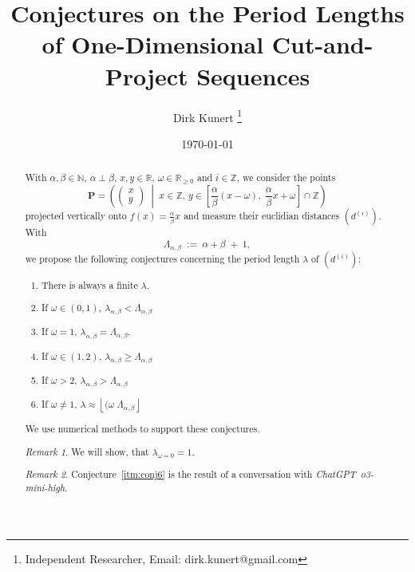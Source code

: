 \documentclass[11pt]{article}
\title{Conjectures on the Period Lengths of One-Dimensional Cut-and-Project Sequences}
\author{Dirk Kunert \thanks{Independent Researcher, Email: dirk.kunert@gmail.com}}
\date{\today}
\theoremstyle{remark}
\newtheorem{remark}{Remark}
\begin{document}
%
\newcommand{\showfigures}{true}
\newcommand{\todo}[1]{\textcolor{red}{TODO: {#1}}}
\newcommand{\langc}[0]{\mbox{C}\xspace}
\newcommand{\langp}[0]{\mbox{Python}\xspace}
\newcommand{\chat}[0]{\mbox{\emph{ChatGPT o3-mini-high}}\xspace}
\newcommand{\function}[1]{\mbox{\texttt{#1}}\xspace}

\maketitle
%
\begin{abstract}
With $\alpha, \beta \in \mathbb{N}$, $\alpha \perp \beta$, $x, y \in \mathbb{R}$, $\omega \in \mathbb{R}_{\ge 0}$ and $i \in \mathbb{Z}$, we consider the points
%
\begin{equation}
\mathbf{P} 
= \left(
\begin{pmatrix} x \\ y \end{pmatrix}
\;\middle|\;
x \in \mathbb{Z},\,
y \in 
\left[\frac{\alpha}{\beta} (x - \omega),\; \frac{\alpha}{\beta} x + \omega\right] 
\cap \mathbb{Z}
\right)\label{eq:points}
\end{equation}
%
projected vertically onto $f(x) = \frac{\alpha}{\beta} x$ and measure their euclidian distances $\left( d^{(i)} \right)$.
%
With
\[
\Lambda_{\alpha, \beta} \;:=\; \alpha + \beta \;+\; 1,
\]
%
we propose the following conjectures concerning the period length $\lambda$ of $\left( d^{(i)} \right)$:
%
\begin{enumerate}
	\item \label{itm:conj1} There is always a finite $\lambda$.
 	\item \label{itm:conj2} If \(\omega \in (0,1)\), $\lambda_{\alpha, \beta} < \Lambda_{\alpha, \beta}$
 	\item \label{itm:conj3} If \(\omega = 1\), $\lambda_{\alpha, \beta} = \Lambda_{\alpha, \beta}$.
 	\item \label{itm:conj4} If \(\omega \in (1,2)\), $\lambda_{\alpha, \beta} \ge \Lambda_{\alpha, \beta}$
 	\item \label{itm:conj5} If \(\omega > 2\), $\lambda_{\alpha, \beta} > \Lambda_{\alpha, \beta}$
 	\item \label{itm:conj6} If \(\omega \ne 1\), $\lambda \approx \left\lfloor (\omega \; \Lambda_{\alpha, \beta} \right\rfloor$
\end{enumerate}
%
We use numerical methods to support these conjectures.
%
\begin{remark}
We will show, that $\lambda_{\omega = 0} = 1$.
\end{remark}
%
\begin{remark}
Conjecture~\ref{itm:conj6} is the result of a conversation with \chat.
\end{remark}
\end{abstract}
\end{document}
